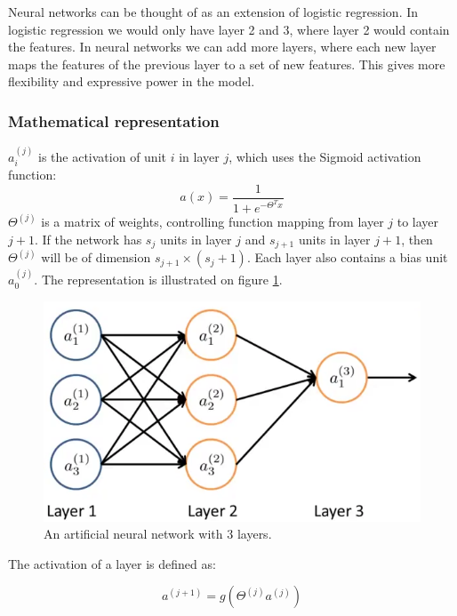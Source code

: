 Neural networks can be thought of as an extension of logistic regression.
In logistic regression we would only have layer 2 and 3, where layer 2 would contain the features.
In neural networks we can add more layers, where each new layer maps the features of the previous layer to a set of new features.
This gives more flexibility and expressive power in the model.

\subsubsection{Mathematical representation}

$a_i^{(j)}$ is the activation of unit $i$ in layer $j$, which uses the Sigmoid activation function: 
\begin{equation}
a(x) = \dfrac{1}{1+e^{-{\Theta}^Tx}}
\end{equation}
$\Theta^{(j)}$ is a matrix of weights, controlling function mapping from layer $j$ to layer $j+1$.
If the network has $s_j$ units in layer $j$ and $s_{j+1}$ units in layer $j+1$, then $\Theta^{(j)}$ will be of dimension $s_{j+1}\times(s_j+1)$.
Each layer also contains a bias unit $a_0^{(j)}$.
The representation is illustrated on figure \ref{fig:neural-network-detailed}.


\begin{figure}[H]
\centering
\includegraphics[scale=.5]{billeder/neural-network-detailed}
\caption{An artificial neural network with 3 layers.}
\label{fig:neural-network-detailed}
\end{figure}

The activation of a layer is defined as:

\begin{equation}
a^{(j+1)} = g(\Theta^{(j)}a^{(j)})
\end{equation}

